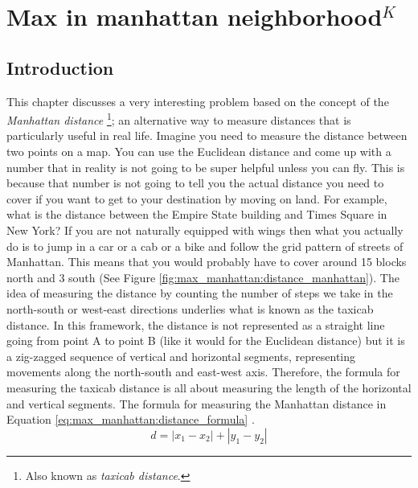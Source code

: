 %



\chapter{Max in manhattan neighborhood$^{K}$}
\label{ch:max_manhattan}

\section*{Introduction}

This chapter discusses a very interesting problem based on the concept of the
\textit{Manhattan distance} \footnote{Also known as \textit{taxicab distance}.}; an alternative way to measure distances that is particularly useful in real life. Imagine
you need to measure the distance between two points on a map. You can use the  Euclidean
distance and come up with a number that in reality is not going to be super helpful unless you can fly. This is because that number is not going to tell you the actual distance you need to
cover if you want to get to your destination by moving on land. For example, what is the distance
between the Empire State building and Times Square in New York? If you are not naturally equipped
with wings then what you actually do is to jump in a car or a cab or a bike and follow the grid pattern of
streets of Manhattan. This means that you would probably have to cover around 15 blocks north and 3 south (See
Figure \ref{fig:max_manhattan:distance_manhattan}). The idea of measuring the distance by
counting the number of steps we take in the north-south or west-east directions underlies what is
known as the taxicab distance. In this framework, the distance is not represented as a straight line
going from point A to point B (like it would for the Euclidean distance) but it is a zig-zagged
sequence of vertical and horizontal segments, representing movements along the north-south and
east-west axis. Therefore, the formula for measuring the taxicab distance is all about measuring
the length of the horizontal and vertical segments. The formula for measuring the Manhattan distance in
Equation \ref{eq:max_manhattan:distance_formula} .
\begin{equation}
    d = |x_1-x_2|+|y_1-y_2|
    \label{eq:max_manhattan:distance_formula}
\end{equation}

